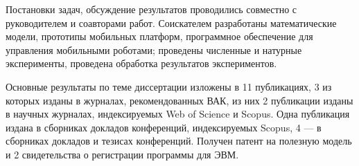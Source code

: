 {\contribution} Постановки задач, обсуждение результатов проводились совместно с руководителем и соавторами работ. Соискателем разработаны математические модели, прототипы мобильных платформ, программное обеспечение для управления мобильными роботами; проведены численные и натурные эксперименты, проведена обработка результатов экспериментов.

{\publications} Основные результаты по теме диссертации изложены в 11 публикациях, 3 из которых изданы в журналах, рекомендованных ВАК, из них 2 публикации изданы в научных журналах, индексируемых Web of Science и Scopus. Одна публикация издана в сборниках докладов конференций, индексируемых Scopus, 4 — в сборниках докладов и тезисах конференций. Получен патент на полезную модель и 2 свидетельства о регистрации программы для ЭВМ.


